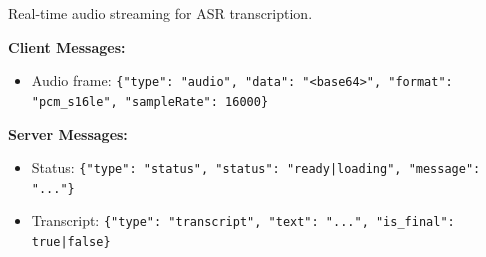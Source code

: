 Real-time audio streaming for ASR transcription.

\textbf{Client Messages:}
\begin{itemize}
    \item Audio frame: \texttt{\{"type": "audio", "data": "<base64>", "format": "pcm\_s16le", "sampleRate": 16000\}}
\end{itemize}

\textbf{Server Messages:}
\begin{itemize}
    \item Status: \texttt{\{"type": "status", "status": "ready|loading", "message": "..."\}}
    \item Transcript: \texttt{\{"type": "transcript", "text": "...", "is\_final": true|false\}}
\end{itemize}
